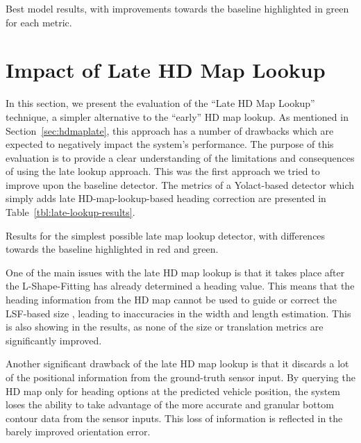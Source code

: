 \begin{table}[htbp]
    
    \caption{Best model results, with improvements towards the baseline highlighted in green for each metric.}
    \label{tbl:best}
\end{table}


\section{Impact of Late HD Map Lookup}
\label{sec:impactlatemap}

In this section, we present the evaluation of the \enquote{Late HD Map Lookup} technique, a simpler alternative to the \enquote{early} HD map lookup.
As mentioned in Section~\ref{sec:hdmaplate}, this approach has a number of drawbacks which are expected to negatively impact the system's performance.
The purpose of this evaluation is to provide a clear understanding of the limitations and consequences of using the late lookup approach.
This was the first approach we tried to improve upon the baseline detector.
The metrics of a Yolact-based detector which simply adds late HD-map-lookup-based heading correction are presented in Table~\ref{tbl:late-lookup-results}.

\begin{table}[htbp]
    
    \caption{Results for the simplest possible late map lookup detector, with differences towards the baseline highlighted in red and green.}
    \label{tbl:late-lookup-results}
\end{table}

One of the main issues with the late HD map lookup is that it takes place after the L-Shape-Fitting has already determined a heading value.
This means that the heading information from the HD map cannot be used to guide or correct the LSF-based size , leading to inaccuracies in the width and length estimation.
This is also showing in the results, as none of the size or translation metrics are significantly improved.

Another significant drawback of the late HD map lookup is that it discards a lot of the positional information from the ground-truth sensor input.
By querying the HD map only for heading options at the predicted vehicle position, the system loses the ability to take advantage of the more accurate and granular bottom contour data from the sensor inputs.
This loss of information is reflected in the barely improved orientation error.

